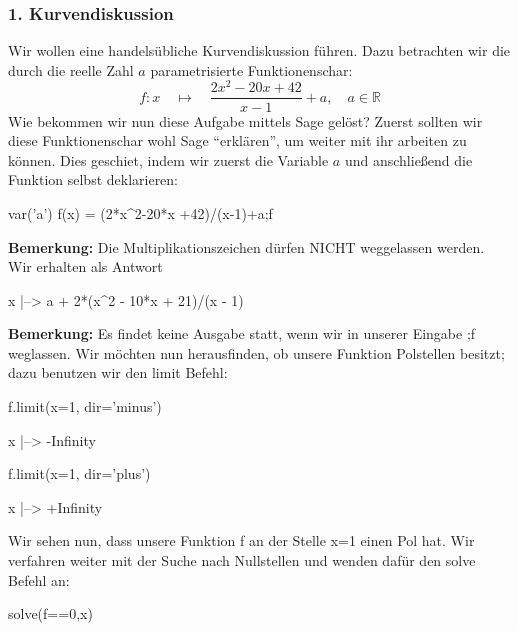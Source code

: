 \documentclass[fontsize=12pt,paper=a4,twoside,bibtotoc,idxtotoc,
liststotoc,pagesize,BCOR1.2cm,DIV15,chapterprefix,pagesize=pdftex]{scrbook}
\begin{document}
\subsubsection{1. Kurvendiskussion}

Wir wollen eine handelsübliche Kurvendiskussion führen. Dazu betrachten wir die durch die reelle Zahl $a$ parametrisierte 
Funktionenschar:
\[ 
f: x \quad \mapsto \quad \frac{2x^2-20x+42}{x-1}+a, \quad
a \in \mathbb{R} 
\]
Wie bekommen wir nun diese Aufgabe mittels Sage gelöst? Zuerst sollten wir diese Funktionenschar wohl Sage ``erklären'', 
um weiter mit ihr arbeiten zu können. Dies geschiet, indem wir zuerst die Variable $a$ und anschließend die Funktion selbst 
deklarieren:\newline
\begin{sagein}
var('a')
f(x) = (2*x^2-20*x +42)/(x-1)+a;f
\end{sagein}
\textbf{Bemerkung:} Die Multiplikationszeichen dürfen NICHT weggelassen werden.\newline
Wir erhalten als Antwort\newline
\begin{sage}
  x |--> a + 2*(x^2 - 10*x + 21)/(x - 1)
\end{sage}
\textbf{Bemerkung:} Es findet keine Ausgabe statt, wenn wir in unserer Eingabe ;f weglassen.\newline
Wir möchten nun herausfinden, ob unsere Funktion Polstellen besitzt; dazu benutzen wir den limit Befehl:\newline
\begin{sagein}
f.limit(x=1, dir='minus')
\end{sagein}
\begin{sage}
  x |--> -Infinity
\end{sage}
\begin{sagein}
f.limit(x=1, dir='plus') 
\end{sagein}
\begin{sage}
  x |--> +Infinity
\end{sage}
Wir sehen nun, dass unsere Funktion f an der Stelle x=1 einen Pol hat. Wir verfahren weiter mit der Suche nach Nullstellen 
und wenden dafür den solve Befehl an:\newline
\begin{sagein}
solve(f==0,x)
\end{sagein}
\begin{sage}
[x == -1/4*a - 1/4*sqrt(a^2 - 32*a + 64) + 5, x == -1/4*a + 1/4*sqrt(a^2 - 32*a + 64) + 5]
\end{sage}
\end{document}
